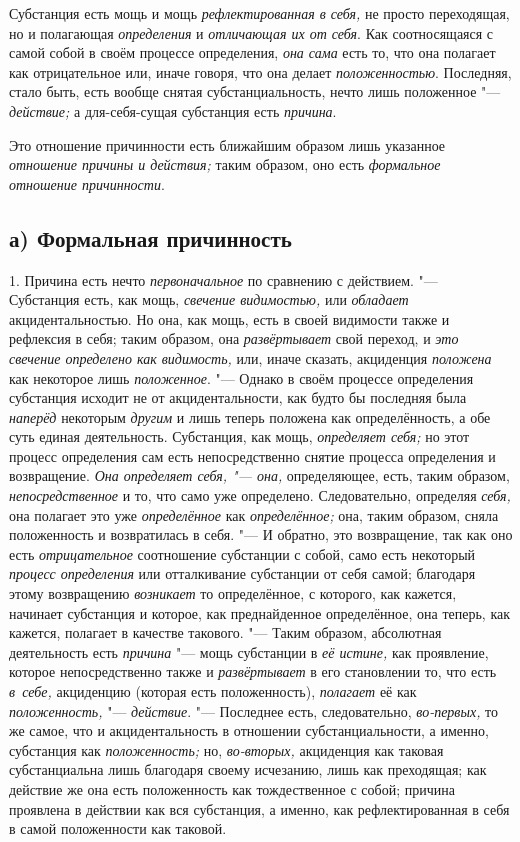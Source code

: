 Субстанция есть мощь и мощь
{\em рефлектированная в себя,} не просто переходящая,
но и полагающая {\em определения} и
{\em отличающая их от себя}. Как соотносящаяся с самой
собой в своём процессе определения, {\em она сама} есть
то, что она полагает как отрицательное или, иначе говоря, что она делает
{\em положенностью}. Последняя, стало быть, есть вообще
снятая субстанциальность, нечто лишь положенное
"--- {\em действие;} а для-себя-сущая субстанция есть {\em причина}.

Это отношение причинности есть ближайшим образом лишь указанное
{\em отношение причины и действия;} таким образом, оно
есть {\em формальное отношение причинности}.


\subsection[а) Формальная причинность]{а) Формальная причинность}

1. Причина есть нечто {\em первоначальное} по сравнению с действием. "---
Субстанция есть, как мощь, {\em свечение видимостью,}
или {\em обладает} акцидентальностью. Но она, как мощь,
есть в своей видимости также и рефлексия в себя; таким образом, она
{\em развёртывает} свой переход, и
{\em это свечение определено как видимость,} или, иначе
сказать, акциденция {\em положена} как некоторое лишь
{\em положенное}. "--- Однако в своём процессе определения
субстанция исходит не от акцидентальности, как будто бы последняя была
{\em наперёд} некоторым {\em другим} и лишь теперь положена как определённость,
а обе суть единая деятельность. Субстанция, как мощь,
{\em определяет себя;} но этот процесс определения сам
есть непосредственно снятие процесса определения и возвращение.
{\em Она определяет себя, "--- она,} определяющее, есть,
таким образом, {\em непосредственное} и то, что само
уже определено. Следовательно, определяя {\em себя,}
она полагает это уже {\em определённое} как
{\em определённое;} она, таким образом, сняла
положенность и возвратилась в себя. "--- И обратно, это возвращение, так как
оно есть {\em отрицательное} соотношение субстанции с
собой, само есть некоторый {\em процесс определения}
или отталкивание субстанции от себя самой; благодаря этому возвращению
{\em возникает} то определённое, с которого, как
кажется, начинает субстанция и которое, как преднайденное определённое, она
теперь, как кажется, полагает в качестве такового. "--- Таким образом,
абсолютная деятельность есть {\em причина} "--- мощь
субстанции в {\em её истине,} как проявление, которое
непосредственно также и {\em развёртывает} в его
становлении то, что есть {\em в~себе,} акциденцию
(которая есть положенность), {\em полагает} её как {\em положенность,} "---
{\em действие}. "--- Последнее есть, следовательно,
{\em во-первых,} то же самое, что и акцидентальность в
отношении субстанциальности, а именно, субстанция как {\em положенность;}
но, {\em во-вторых,} акциденция как таковая субстанциальна
лишь благодаря своему исчезанию, лишь как преходящая; как действие же она
есть положенность как тождественное с собой; причина проявлена в действии
как вся субстанция, а именно, как рефлектированная в себя в самой
положенности как таковой.

